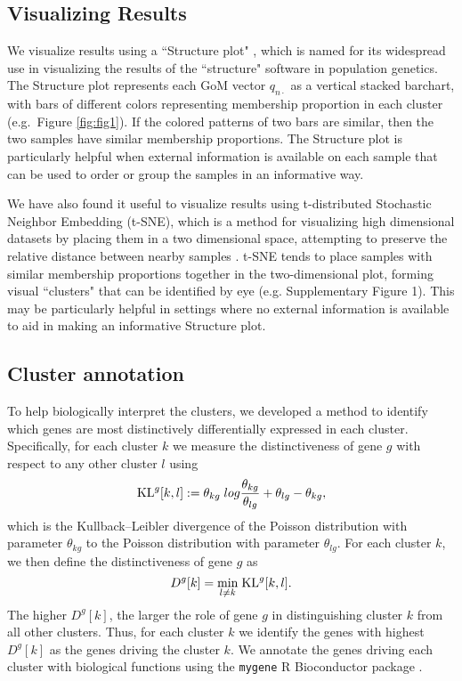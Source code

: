 \subsection{Visualizing Results}

We visualize results using a ``Structure plot" \cite{Rosenberg2002}, 
which is named for its widespread use in visualizing the
results of the ``structure" software \cite{Pritchard2000} in population genetics.
The Structure plot represents each GoM vector $q_{n\cdot}$
as  a vertical stacked barchart, with bars of different colors representing membership proportion in each cluster (e.g.~Figure \ref{fig:fig1}). If the colored patterns of two bars are similar, then the two samples have similar membership proportions.  The Structure plot is particularly helpful when external information is available on each sample that can be used to order or group the samples in an informative way.

We have also found it useful to visualize results using t-distributed Stochastic Neighbor Embedding (t-SNE), which is a method for visualizing high dimensional datasets by placing them in a two dimensional space, attempting to preserve the relative distance between nearby samples \cite{Maaten2014,Maaten2008}. t-SNE tends to place samples with similar membership proportions together in the two-dimensional plot, forming visual ``clusters" that can be identified by eye (e.g. Supplementary Figure 1). This may be particularly helpful in settings where no external information is available to aid in making an informative Structure plot. 


\subsection{Cluster annotation}

To help biologically interpret the clusters, we developed a method to identify which genes are most distinctively differentially expressed in each cluster.  Specifically, for each cluster $k$ we measure the distinctiveness of gene $g$ with respect to any other cluster $l$ using
\begin{equation}
\text{KL}^{g} [k,l] : = \theta_{kg} \; log \frac{\theta_{kg}}{\theta_{lg}} + \theta_{lg} - \theta_{kg},
\end{equation}
which is the Kullback--Leibler divergence of the Poisson distribution with parameter $\theta_{kg}$ to the Poisson distribution with parameter $\theta_{lg}$. 
For each cluster $k$, we then define the distinctiveness of gene $g$ as 
\begin{equation}
D^{g}[k] = \underset{l \neq k}{\min} \; \text{KL}^{g} [k, l].
\end{equation}
The higher $D^g[k]$, the larger the role of gene $g$ in distinguishing cluster $k$ from all other clusters. 
Thus, for each cluster $k$ we identify the genes with highest $D^{g}[k]$ as the genes driving the cluster $k$. 
We annotate the genes driving each cluster with biological functions using the {\tt mygene} R Bioconductor package  \cite{Thompson2014}.

